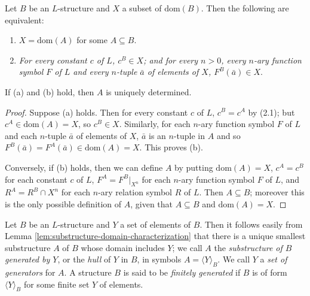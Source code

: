 \begin{lemma}
    \label{lem:substructure-domain-characterization}
    Let \( B \) be an \( L \)-structure and \( X \) a subset of \( \mathrm{dom}(B) \). Then the following are equivalent:
    \begin{enumerate}
        \item[(a)] \( X = \mathrm{dom}(A) \) for some \( A \subseteq B \).
        \item[(b)] \emph{For every constant \( c \) of \( L \), \( c^B \in X \); and for every \( n > 0 \), every \( n \)-ary function symbol \( F \) of \( L \) and every \( n \)-tuple \( \bar{a} \) of elements of \( X \), \( F^B(\bar{a}) \in X \)}.
    \end{enumerate}
    If (a) and (b) hold, then \( A \) is uniquely determined.
\end{lemma}

\begin{proof}
    Suppose (a) holds. Then for every constant \( c \) of \( L \), \( c^B = c^A \) by (2.1); but \( c^A \in \mathrm{dom}(A) = X \), so \( c^B \in X \). Similarly, for each \( n \)-ary function symbol \( F \) of \( L \) and each \( n \)-tuple \( \bar{a} \) of elements of \( X \), \( \bar{a} \) is an \( n \)-tuple in \( A \) and so \( F^B(\bar{a}) = F^A(\bar{a}) \in \mathrm{dom}(A) = X \). This proves (b).

    Conversely, if (b) holds, then we can define \( A \) by putting \( \mathrm{dom}(A) = X \), \( c^A = c^B \) for each constant \( c \) of \( L \), \( F^A = F^B|_{X^n} \) for each \( n \)-ary function symbol \( F \) of \( L \), and \( R^A = R^B \cap X^n \) for each \( n \)-ary relation symbol \( R \) of \( L \). Then \( A \subseteq B \); moreover this is the only possible definition of \( A \), given that \( A \subseteq B \) and \( \mathrm{dom}(A) = X \).
\end{proof}



\begin{definition}
    Let \( B \) be an \( L \)-structure and \( Y \) a set of elements of \( B \). Then it follows easily from Lemma \ref{lem:substructure-domain-characterization} that there is a unique smallest substructure \( A \) of \( B \) whose domain includes \( Y \); we call \( A \) the \emph{substructure of \( B \) generated by \( Y \)}, or the \emph{hull} of \( Y \) in \( B \), in symbols \( A = \langle Y \rangle_B \). We call \( Y \) a \emph{set of generators} for \( A \). A structure \( B \) is said to be \emph{finitely generated} if \( B \) is of form \( \langle Y \rangle_B \) for some finite set \( Y \) of elements.
\end{definition}

